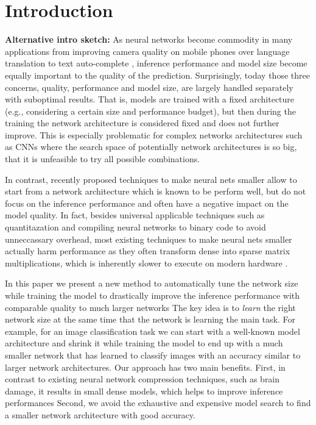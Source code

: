 
\section{Introduction}
{\bf Alternative intro sketch:}
As neural networks become commodity in many applications from improving camera quality on mobile phones \cite{googleapple} over language translation \cite{languagetranslation} to text auto-complete \cite{autocomplete}, inference performance and model size become equally important to the quality of the prediction.  
Surprisingly, today those three concerns, quality, performance and model size, are largely handled separately with suboptimal results. 
That is, models are trained with a fixed architecture (e.g., considering a certain size and performance budget), but then during the training the network architecture is considered fixed and does not further improve.
This is especially problematic for complex networks architectures such as CNNs where the search space of potentially network architectures is so big, that it is unfeasible to try all possible combinations. 
 
In contrast, recently proposed techniques to make neural nets smaller \cite{something1,something2} allow to start from a network architecture which is known to be perform well, but do not focus on the inference performance and often have a negative impact on the model quality.
In fact, besides universal applicable techniques such as quantitazation \cite{quant} and compiling neural networks to binary code to avoid unneccassary overhead, most existing techniques to make neural nets smaller actually harm performance as they often transform dense into sparse matrix multiplications, which is inherently slower to execute on modern hardware \cite{something}. 

In this paper we present a new method to automatically tune the network size while training the model to drastically improve the inference performance with comparable quality to much larger networks  
The key idea is to \emph{learn} the right network size at the same time that the network is learning the main task. 
For example, for an image classification task we can start with a well-known model architecture and shrink it while training the model  to end up with a much smaller network that has learned to classify images with an accuracy similar to larger network architectures.
Our approach has two main benefits. 
First, in contrast to existing neural network compression techniques, such as brain damage, it results in small dense models, which helps to improve inference performances
Second, we avoid the exhaustive and expensive model search to find a smaller network architecture with good accuracy. 

